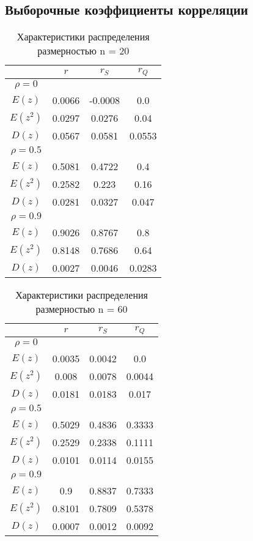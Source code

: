 \documentclass[../main.tex]{subfiles}
\begin{document}
    \subsection {Выборочные коэффициенты корреляции}
    \begin{table}[H]
        \centering
        \begin{tabular}{|c|c|c|c|}
            \hline
            & $r$ & $r_S$ & $r_Q$\\\hline
            $\rho=0$ & & &\\\hline
            $E(z)$ & 0.0066 & -0.0008 & 0.0\\\hline
            $E(z^2)$ & 0.0297 & 0.0276 & 0.04\\\hline
            $D(z)$ & 0.0567 & 0.0581 & 0.0553\\\hline
            \hline
            $\rho=0.5$ & & &\\\hline
            $E(z)$ & 0.5081 & 0.4722 & 0.4\\\hline
            $E(z^2)$ & 0.2582 & 0.223 & 0.16\\\hline
            $D(z)$ & 0.0281 & 0.0327 & 0.047\\\hline
            \hline
            $\rho=0.9$ & & &\\\hline
            $E(z)$ & 0.9026 & 0.8767 & 0.8\\\hline
            $E(z^2)$ & 0.8148 & 0.7686 & 0.64\\\hline
            $D(z)$ & 0.0027 & 0.0046 & 0.0283\\\hline
        \end{tabular}
        \caption{Характеристики распределения размерностью n = 20}
    \end{table}
    
    \begin{table}[H]
        \centering
        \begin{tabular}{|c|c|c|c|}
            \hline
            & $r$ & $r_S$ & $r_Q$\\\hline
            $\rho=0$ & & &\\\hline
            $E(z)$ & 0.0035 & 0.0042 & 0.0\\\hline
            $E(z^2)$ & 0.008 & 0.0078 & 0.0044\\\hline
            $D(z)$ & 0.0181 & 0.0183 & 0.017\\\hline
            \hline
            $\rho=0.5$ & & &\\\hline
            $E(z)$ & 0.5029 & 0.4836 & 0.3333\\\hline
            $E(z^2)$ & 0.2529 & 0.2338 & 0.1111\\\hline
            $D(z)$ & 0.0101 & 0.0114 & 0.0155\\\hline
            \hline
            $\rho=0.9$ & & &\\\hline
            $E(z)$ & 0.9 & 0.8837 & 0.7333\\\hline
            $E(z^2)$ & 0.8101 & 0.7809 & 0.5378\\\hline
            $D(z)$ & 0.0007 & 0.0012 & 0.0092\\\hline
        \end{tabular}
        \caption{Характеристики распределения размерностью n = 60}
    \end{table}
    
\end{document}
